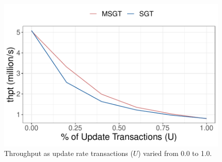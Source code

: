 \begin{figure}[htbp]
    \centering
    \includegraphics[width=0.6\linewidth]{figs/ycsb_update_rate_thpt.pdf}%
    \caption{Throughput as update rate transactions ($U$) varied from 0.0 to 1.0.}
    \label{fig:update-rate-a}
\end{figure}

